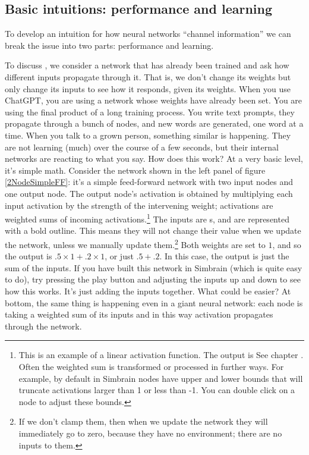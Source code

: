\subsection{Basic intuitions: performance and learning}

To develop an intuition for how neural networks ``channel information'' we can break the issue into two parts: performance and learning. 
 
To discuss , we consider a network that has already been trained and ask how different inputs propagate through it. That is, we don't change its weights but only change its inputs to see how it responds, given its weights. When you use ChatGPT, you are using a network whose weights have already been set. You are using the final product of a long training process. You write text prompts, they propagate through a bunch of nodes, and new words are generated, one word at a time.  When you talk to a grown person, something similar is happening. They are not learning (much) over the course of a few seconds, but their internal networks are reacting to what you say.  How does this work? At a very basic level, it's simple math. Consider the network shown in the left panel of figure \ref{2NodeSimpleFF}: it's a simple feed-forward network with two input nodes and one output node. The output node's activation is obtained by multiplying each input activation by the strength of the intervening weight; activations are weighted sums of incoming activations.\footnote{This is an example of a linear activation function. The output is See chapter . Often the weighted sum is transformed or processed in further ways. For example, by default in Simbrain nodes have upper and lower bounds that will truncate  activations larger than 1 or less than -1. You can double click on a node to adjust these bounds.}  The inputs are s, and are represented with a bold outline. This means they will not change their value when we update the network, unless we manually update them.\footnote{If we don't clamp them, then when we update the network they will immediately go to zero, because they have no environment; there are no inputs to them.} Both weights are set to $1$, and so the output is  $.5 \times 1 + .2 \times 1$, or just $.5+.2$. In this case, the output is just the sum of the inputs.  If you have built this network in Simbrain (which is quite easy to do), try pressing the play button and adjusting the inputs up and down to see how this works. It's just adding the inputs together. What could be easier?  At bottom, the same thing is happening even in a giant neural network: each node is taking a weighted sum of its inputs and in this way activation propagates through the network.

